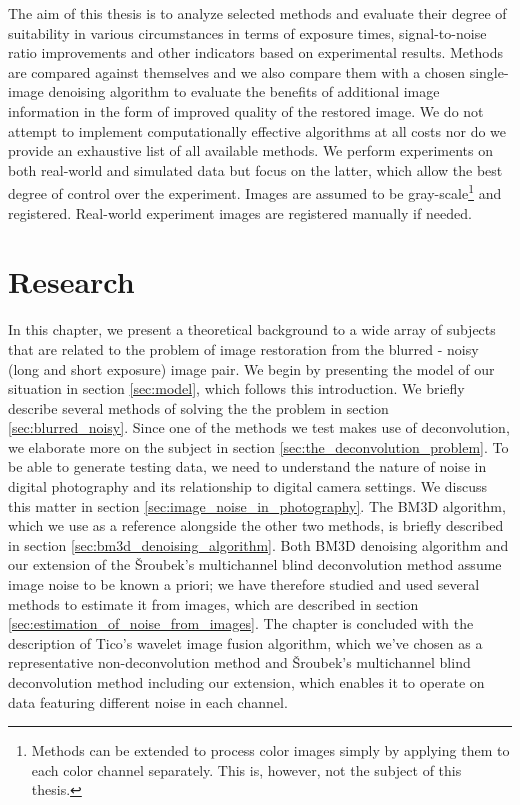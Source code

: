 \documentclass[12pt,notitlepage]{report}
\begin{document}
The aim of this thesis is to analyze selected methods and evaluate their degree of suitability in various circumstances in terms of exposure times, signal-to-noise ratio improvements and other indicators based on experimental results. Methods are compared against themselves and we also compare them with a chosen single-image denoising algorithm to evaluate the benefits of additional image information in the form of improved quality of the restored image. We do not attempt to implement computationally effective algorithms at all costs nor do we provide an exhaustive list of all available methods. We perform experiments on both real-world and simulated data but focus on the latter, which allow the best degree of control over the experiment. Images are assumed to be gray-scale\footnote[2]{Methods can be extended to process color images simply by applying them to each color channel separately. This is, however, not the subject of this thesis.} and registered. Real-world experiment images are registered manually if needed.

\clearpage

\chapter{Research}
\label{chap:research}

In this chapter, we present a theoretical background to a wide array of subjects that are related to the problem of image restoration from the blurred - noisy (long and short exposure) image pair. We begin by presenting the model of our situation in section \ref{sec:model}, which follows this introduction. We briefly describe several methods of solving the the problem in section \ref{sec:blurred_noisy}. Since one of the methods we test makes use of deconvolution, we elaborate more on the subject in section \ref{sec:the_deconvolution_problem}. To be able to generate testing data, we need to understand the nature of noise in digital photography and its relationship to digital camera settings. We discuss this matter in section  \ref{sec:image_noise_in_photography}. The BM3D algorithm, which we use as a reference alongside the other two methods, is briefly described in section \ref{sec:bm3d_denoising_algorithm}. Both BM3D denoising algorithm and our extension of the Šroubek's multichannel blind deconvolution method assume image noise to be known a priori; we have therefore studied and used several methods to estimate it from images, which are described in section \ref{sec:estimation_of_noise_from_images}. The chapter is concluded with the description of Tico's wavelet image fusion algorithm, which we've chosen as a representative non-deconvolution method and Šroubek's multichannel blind deconvolution method including our extension, which enables it to operate on data featuring different noise in each channel.    
\end{document}
